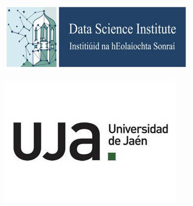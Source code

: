 \documentclass[11pt,oneside]{book}
\begin{document}
\begin{samepage}
            \begin{minipage}[c][0.21\linewidth][c]{0.21\linewidth}
        \includegraphics[width=\linewidth]{LT-EDI-2025/sponsor_logos/DSI_logo.png}
      \end{minipage}\hspace{0.05\linewidth}
          \begin{minipage}[c][0.21\linewidth][c]{0.21\linewidth}
        \includegraphics[width=\linewidth]{LT-EDI-2025/sponsor_logos/uja.png}
      \end{minipage}\hspace{0.05\linewidth}
    
    \end{samepage}

  \bigskip
  \bigskip
\newpage
\end{document}
